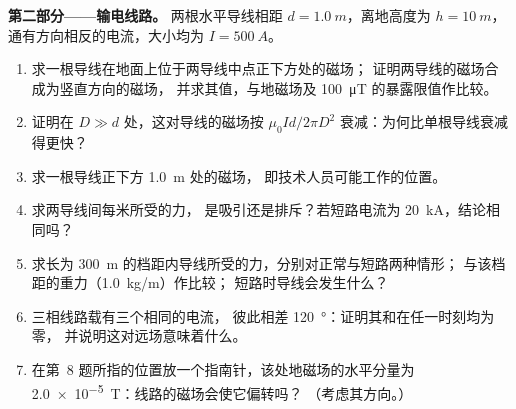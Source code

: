 \begin{problem}
\medskip
\noindent\textbf{第二部分——输电线路。}
两根水平导线相距 $d = \qty{1.0}{m}$，离地高度为 $h = \qty{10}{m}$，
通有方向相反的电流，大小均为 $I = \qty{500}{A}$。
\begin{enumerate}[resume]
  \item 求一根导线在地面上位于两导线中点正下方处的磁场；
        证明两导线的磁场合成为竖直方向的磁场，
        并求其值，与地磁场及
        \qty{100}{\micro T} 的暴露限值作比较。
  \item 证明在 $D \gg d$ 处，这对导线的磁场按
        $\mu_0Id/2\pi D^2$ 衰减：为何比单根导线衰减得更快？
  \item 求一根导线正下方 \qty{1.0}{m} 处的磁场，
        即技术人员可能工作的位置。
  \item 求两导线间每米所受的力，
        是吸引还是排斥？若短路电流为 \qty{20}{kA}，结论相同吗？
  \item 求长为 \qty{300}{m} 的档距内导线所受的力，分别对正常与短路两种情形；
        与该档距的重力（\qty{1.0}{kg/m}）作比较；
        短路时导线会发生什么？
  \item 三相线路载有三个相同的电流，
        彼此相差 \qty{120}{\degree}：证明其和在任一时刻均为零，
        并说明这对远场意味着什么。
  \item 在第~8 题所指的位置放一个指南针，该处地磁场的水平分量为
        \qty{2.0e-5}{T}：线路的磁场会使它偏转吗？
        （考虑其方向。）
\end{enumerate}


\end{problem}
